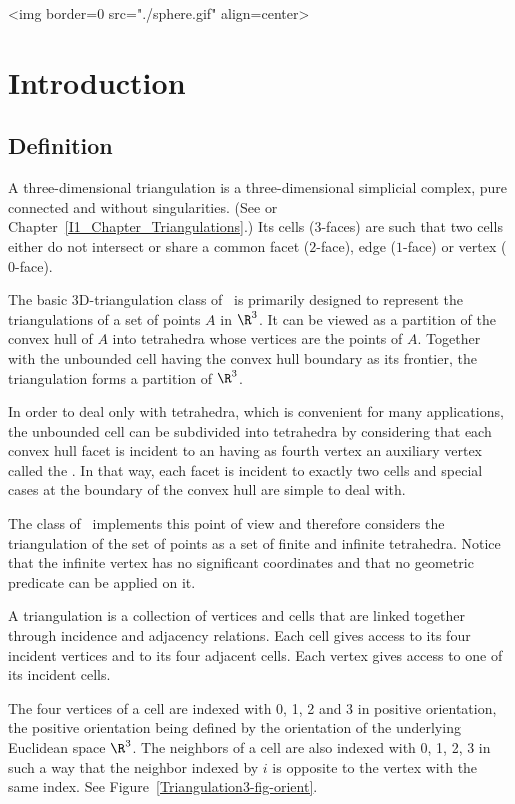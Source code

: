\begin{ccHtmlOnly}
<img border=0 src="./sphere.gif" align=center>
\end{ccHtmlOnly}
\section{Introduction}
\label{Triangulation3-sec-intro}
\subsection{Definition}
\label{Triangulation3-sec-def}
A three-dimensional triangulation is a three-dimensional simplicial
complex, pure connected and without singularities. (See
\cite{by-ag-98} or Chapter~\ref{I1_Chapter_Triangulations}.) Its
cells ($3$-faces) are such that two cells either do not intersect or
share a common facet ($2$-face), edge ($1$-face) or vertex ($0$-face).

The basic 3D-triangulation class of \cgal\ is primarily designed to
represent the triangulations of a set of points $A$ in $\R^3$.  It can
be viewed as a partition of the convex hull of {$A$} into tetrahedra
whose vertices are the points of {$A$}.  Together with the unbounded
cell having the convex hull boundary as its frontier, the triangulation
forms a partition of $\R^3$.

In order to deal
only with tetrahedra, which is convenient for many applications, the
unbounded cell can be subdivided into tetrahedra by considering that
each convex hull facet is incident to an  having as
fourth vertex an auxiliary vertex called the .  In
that way, each facet is incident to exactly two cells and special cases
at the boundary of the convex hull are simple to deal with.

The class  of \cgal\ implements this
point of view and therefore considers the triangulation of the set
of points as a set of finite and infinite tetrahedra.  Notice that the
infinite vertex has no significant coordinates and that no
geometric predicate can be applied on it.

A triangulation is a collection of vertices and cells that are linked
together through incidence and adjacency relations. Each cell gives
access to its four incident vertices and to its four adjacent
cells. Each vertex gives access to one of its incident cells.

The four vertices of a cell are indexed with 0, 1, 2 and 3 in positive
orientation, the positive orientation being defined by the orientation
of the underlying Euclidean space $\R^3$. The neighbors of a cell are also
indexed with 0, 1, 2, 3 in such a way that the neighbor indexed by $i$
is opposite to the vertex with the same index. See
Figure~\ref{Triangulation3-fig-orient}.

